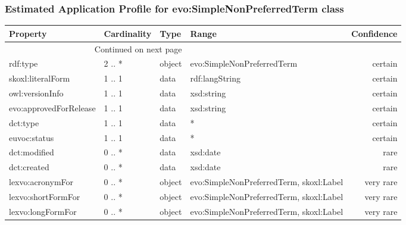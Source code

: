 \documentclass[10pt,a4paper,titlepage,final]{article}
\begin{document}
\subsubsection{Estimated Application Profile for evo:SimpleNonPreferredTerm class}
\begin{tabularx}{\textwidth}{lllXr}
\toprule
               Property & Cardinality &    Type &                                    Range & Confidence \\
\midrule
\endhead
\midrule
\multicolumn{3}{r}{{Continued on next page}} \\
\midrule
\endfoot

\bottomrule
\endlastfoot
               rdf:type &      2 .. * &  object &               evo:SimpleNonPreferredTerm &    certain \\
      skoxl:literalForm &      1 .. 1 &    data &                           rdf:langString &    certain \\
        owl:versionInfo &      1 .. 1 &    data &                               xsd:string &    certain \\
 evo:approvedForRelease &      1 .. 1 &    data &                               xsd:string &    certain \\
               dct:type &      1 .. 1 &    data &                                        * &    certain \\
           euvoc:status &      1 .. 1 &    data &                                        * &    certain \\
           dct:modified &      0 .. * &    data &                                 xsd:date &       rare \\
            dct:created &      0 .. * &    data &                                 xsd:date &       rare \\
       lexvo:acronymFor &      0 .. * &  object &  evo:SimpleNonPreferredTerm, skoxl:Label &  very rare \\
     lexvo:shortFormFor &      0 .. * &  object &  evo:SimpleNonPreferredTerm, skoxl:Label &  very rare \\
      lexvo:longFormFor &      0 .. * &  object &  evo:SimpleNonPreferredTerm, skoxl:Label &  very rare \\
\end{tabularx}
\end{document}

